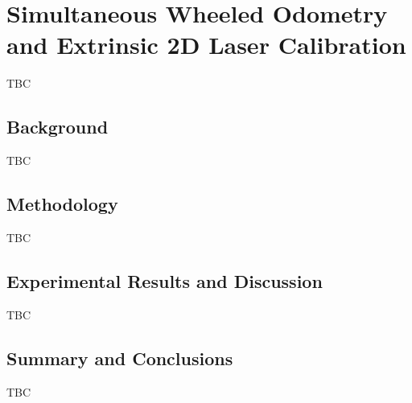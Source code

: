 \chapter{Simultaneous Wheeled Odometry and Extrinsic 2D Laser Calibration}\label{chap:calibration}

TBC

\section{Background}\label{sec:calibration:background}

TBC

\section{Methodology}\label{sec:calibration:method}

TBC

\section{Experimental Results and Discussion}\label{sec:calibration:results}

TBC

\section{Summary and Conclusions}\label{sec:calibration:conclusions}

TBC